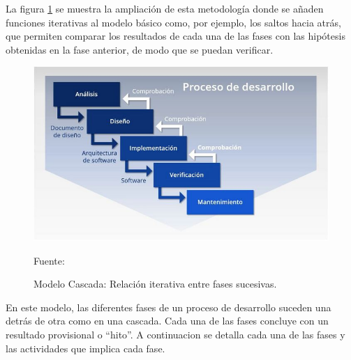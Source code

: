 La figura \ref{fig:cascada_iterativa} se muestra la ampliación de esta metodología donde se añaden funciones iterativas al modelo básico como, por ejemplo, los saltos hacia atrás, que permiten comparar los resultados de cada una de las fases con las hipótesis obtenidas en la fase anterior, de modo que se puedan verificar.\\

\begin{figure}[H]
    \begin{center}
        \includegraphics[width=12cm]{img/capitulo_2/waterfall.jpeg}
    \end{center}
    \begin{center}
        \caption{Modelo Cascada: Relación iterativa entre fases sucesivas.}
        Fuente: \cite{blog:modelocascada}
        \label{fig:cascada_iterativa}    
    \end{center}
\end{figure}

En este modelo, las diferentes fases de un proceso de desarrollo suceden una detrás de otra como en una cascada. Cada una de las fases concluye con un resultado provisional o ``hito''. A continuacion se detalla cada una de las fases y las actividades que implica cada fase.\\

